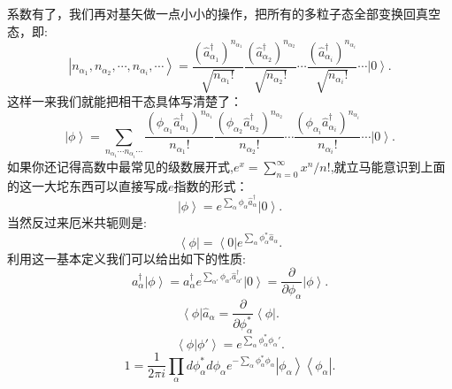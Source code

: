 \documentclass[12pt, a4paper, oneside]{ctexart}
\begin{document}
系数有了，我们再对基矢做一点小小的操作，把所有的多粒子态全部变换回真空态，即:
\begin{equation}
    \left|  n_{\alpha_1},n_{\alpha_2},\cdots,n_{\alpha_i},\cdots \right>=\frac{(\hat a^\dagger_{\alpha_1})^{n_{\alpha_1}}}{\sqrt{n_{\alpha_1}!}}\frac{(\hat a^\dagger_{\alpha_2})^{n_{\alpha_2}}}{\sqrt{n_{\alpha_2}!}}\cdots\frac{(\hat a^\dagger_{\alpha_i})^{n_{\alpha_i}}}{\sqrt{n_{\alpha_i}!}}\cdots\left| 0 \right>.
\end{equation}
这样一来我们就能把相干态具体写清楚了：
\begin{equation}
    \left| \phi \right>=\sum_{n_{\alpha_1}\cdots n_{\alpha_i}\cdots}\frac{(\phi_{\alpha_1}\hat a^\dagger_{\alpha_1})^{n_{\alpha_1}}}{{n_{\alpha_1}!}}\frac{(\phi_{\alpha_2}\hat a^\dagger_{\alpha_2})^{n_{\alpha_2}}}{{n_{\alpha_2}!}}\cdots\frac{(\phi_{\alpha_i}\hat a^\dagger_{\alpha_i})^{n_{\alpha_i}}}{{n_{\alpha_i}!}}\cdots\left| 0 \right>.
\end{equation}
如果你还记得高数中最常见的级数展开式,$e^x=\sum_{n=0}^{\infty}x^n/n!$,就立马能意识到上面的这一大坨东西可以直接写成$e$指数的形式：
\begin{equation}
    \left| \phi \right>=e^{\sum_{\alpha}\phi_\alpha \hat a^\dagger_\alpha}\left| 0 \right>.
\end{equation}
当然反过来厄米共轭则是:
\begin{equation}
    \left<\phi \right|=\left< 0 \right|e^{\sum_{\alpha}\phi_\alpha^* \hat a_\alpha}.
\end{equation}
利用这一基本定义我们可以给出如下的性质:
\begin{equation}
    a_{\alpha}^\dagger\left| \phi \right>=a_{\alpha}^\dagger e^{\sum_{\alpha'}\phi_{\alpha'}\hat a^\dagger_{\alpha'}}\left| 0 \right>=\frac{\partial}{\partial\phi_\alpha}\left| \phi \right>.
\end{equation}
\begin{equation}
    \left< \phi \right|\hat a_\alpha=\frac{\partial}{\partial\phi^*_\alpha}\left< \phi \right|.
\end{equation}
\begin{equation}
    \left<\phi |\phi' \right>=e^{\sum_{\alpha}\phi_{\alpha}^*\phi_{\alpha}'}.
\end{equation}
\begin{equation}
    1=\frac{1}{2\pi i}\prod_\alpha d\phi^*_{\alpha}d\phi_{\alpha}e^{-\sum_\alpha \phi^*_{\alpha}\phi_{\alpha}}\left|  \phi_{\alpha} \right> \left<  \phi_{\alpha}\right|.
\end{equation}
\end{document}
